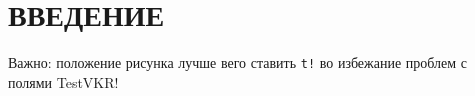 \chapter*{ВВЕДЕНИЕ}

Важно: положение рисунка лучше вего ставить \texttt{t!} во избежание проблем с полями TestVKR!